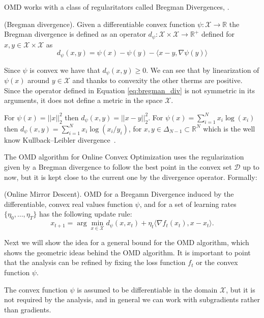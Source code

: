 OMD works with a class of regularitators called Bregman Divergences, \cite{banerjee2005clustering}.

\begin{definition}(Bregman divergence). Given a differentiable convex function $\psi:\mathcal X\to\mathbb R$ the Bregman divergence is defined as an operator $d_{\psi}:\mathcal X\times\mathcal X\to \mathbb R^+$ defined for $x,y\in\mathcal X\times\mathcal X$ as 
\begin{equation}\label{eq:bregman_div}
d_\psi(x,y)=\psi(x)-\psi(y)-\langle x-y,\nabla \psi(y)\rangle
\end{equation}
\end{definition}

Since $\psi$ is convex we have that $d_\psi(x,y)\ge0$. We can see that by linearization of $\psi(x)$ around $y\in\mathcal X$ and thanks to convexity the other therms are positive. Since the operator defined in Equation \eqref{eq:bregman_div} is not symmetric in its arguments, it does not define a metric in the space $\mathcal X$.

For $\psi(x)=||x||_2^2$ then $d_\psi(x,y)=||x-y||_2^2$. For $\psi(x)=\sum\limits_{i=1}^Nx_i\log(x_i)$ then $d_\psi(x,y)=\sum\limits_{i=1}^Nx_i\log(x_i/y_i)$, for $x,y\in\Delta_{N-1}\subset \mathbb R^N$ which is the well know Kullback–Leibler divergence~\cite{van2014renyi}.

The OMD algorithm for Online Convex Optimization uses the regularization given by a Bregman divergence to follow the best point in the convex set $\mathcal D$ up to now, but it is kept close to the current one by the divergence operator. Formally:

\begin{definition}(Online Mirror Descent). OMD for a Bregamn Divergence induced by the differentiable, convex real values function $\psi$, and for a set of learning rates $\{\eta_0,\ldots,\eta_T\}$ has the following update rule: 
$$x_{t+1} =\arg\min\limits_{x\in\mathcal X} d_\psi(x,x_t)+\eta_t\langle\nabla f_t(x_t),x-x_t\rangle.$$
\end{definition}

Next we will show the idea for a general bound for the OMD algorithm, which shows the geometric ideas behind the OMD algorithm. It is important to point that the analysis can be refined by fixing the loss function $f_t$ or the convex function $\psi$.

The convex function $\psi$ is assumed to be differentiable in the domain $\mathcal X$, but it is not required by the analysis, and in general we can work with subgradients rather than gradients.   

